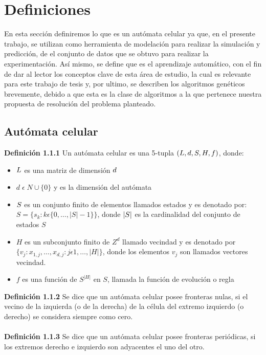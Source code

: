 \section{Definiciones}

En esta sección definiremos lo que es un autómata celular ya que, en el presente trabajo, se utilizan como herramienta de modelación para realizar la simulación y predicción, de el conjunto de datos que se obtuvo para realizar la experimentación. Así mismo, se define que es el aprendizaje automático, con el fin de dar al lector los conceptos clave de esta área de estudio, la cual es relevante para este trabajo de tesis y, por ultimo, se describen los algoritmos genéticos brevemente, debido a que esta es la clase de algoritmos a la que pertenece nuestra propuesta de resolución del problema planteado.


\subsection{Autómata celular}

\textbf{Definición 1.1.1} Un autómata celular es una 5-tupla $\mathnormal{(L, d, S, H, f)}$, donde:
\begin{itemize}
	\item $\mathnormal{L}$ es una matriz de dimensión $\mathnormal{d}$
	\item ${d\; \epsilon\; N\cup\{0\}}$ y es la dimensión del autómata
	\item $\mathnormal{S}$ es un conjunto finito de elementos llamados estados y es denotado por:
	\\
	${S=\{s_{k}:k \epsilon \{0,\dots,|S|-1\}\}}$, donde $\mathnormal{|S|}$ es la cardinalidad del conjunto de estados $S$
	\item $H$ es un subconjunto finito de $Z^{d}$ llamado vecindad y es denotado por $\{v_{j}:x_{1,j},\dots,x_{d,j}:j\epsilon1,\dots,|H|\}$, donde los elementos $v_{j}$ son llamados vectores vecindad.
	\item $f$ es una función de $S^{|H|}$ en $S$, llamada la función de evolución o regla
\end{itemize}
\textbf{Definición 1.1.2} Se dice que un autómata celular posee fronteras nulas, si el vecino de la izquierda (o de la derecha) de la célula del extremo izquierdo (o derecho) se considera siempre como cero.
\\
\\
\textbf{Definición 1.1.3} Se dice que un autómata celular posee fronteras periódicas, si los extremos derecho e izquierdo son adyacentes el uno del otro.

